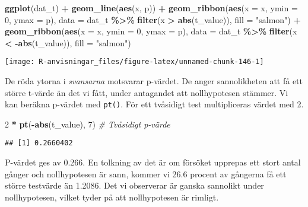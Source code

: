 \documentclass[
]{book}
\newenvironment{Shaded}{\begin{snugshade}}{\end{snugshade}}
\newcommand{\AttributeTok}[1]{\textcolor[rgb]{0.13,0.29,0.53}{#1}}
\newcommand{\CommentTok}[1]{\textcolor[rgb]{0.56,0.35,0.01}{\textit{#1}}}
\newcommand{\DecValTok}[1]{\textcolor[rgb]{0.00,0.00,0.81}{#1}}
\newcommand{\FunctionTok}[1]{\textcolor[rgb]{0.13,0.29,0.53}{\textbf{#1}}}
\newcommand{\NormalTok}[1]{#1}
\newcommand{\SpecialCharTok}[1]{\textcolor[rgb]{0.81,0.36,0.00}{\textbf{#1}}}
\newcommand{\StringTok}[1]{\textcolor[rgb]{0.31,0.60,0.02}{#1}}
\theoremstyle{definition}
\theoremstyle{definition}
\theoremstyle{definition}
\theoremstyle{definition}
\theoremstyle{remark}
\begin{document}
\begin{Shaded}
\begin{Highlighting}[]
\FunctionTok{ggplot}\NormalTok{(dat\_t) }\SpecialCharTok{+}
  \FunctionTok{geom\_line}\NormalTok{(}\FunctionTok{aes}\NormalTok{(x, p)) }\SpecialCharTok{+}
  \FunctionTok{geom\_ribbon}\NormalTok{(}\FunctionTok{aes}\NormalTok{(}\AttributeTok{x =}\NormalTok{ x, }\AttributeTok{ymin =} \DecValTok{0}\NormalTok{, }\AttributeTok{ymax =}\NormalTok{ p), }\AttributeTok{data =}\NormalTok{ dat\_t }\SpecialCharTok{\%\textgreater{}\%} \FunctionTok{filter}\NormalTok{(x }\SpecialCharTok{\textgreater{}} \FunctionTok{abs}\NormalTok{(t\_value)), }\AttributeTok{fill =} \StringTok{"salmon"}\NormalTok{) }\SpecialCharTok{+}
  \FunctionTok{geom\_ribbon}\NormalTok{(}\FunctionTok{aes}\NormalTok{(}\AttributeTok{x =}\NormalTok{ x, }\AttributeTok{ymin =} \DecValTok{0}\NormalTok{, }\AttributeTok{ymax =}\NormalTok{ p), }\AttributeTok{data =}\NormalTok{ dat\_t }\SpecialCharTok{\%\textgreater{}\%} \FunctionTok{filter}\NormalTok{(x }\SpecialCharTok{\textless{}} \SpecialCharTok{{-}}\FunctionTok{abs}\NormalTok{(t\_value)), }\AttributeTok{fill =} \StringTok{"salmon"}\NormalTok{)}
\end{Highlighting}
\end{Shaded}

\begin{center}\texttt{[image: R-anvisningar\_files/figure-latex/unnamed-chunk-146-1]} \end{center}

De röda ytorna i \emph{svansarna} motsvarar p-värdet. De anger sannolikheten att få ett större t-värde än det vi fått, under antagandet att nollhypotesen stämmer. Vi kan beräkna p-värdet med \texttt{pt()}. För ett tvåsidigt test multipliceras värdet med 2.

\begin{Shaded}
\begin{Highlighting}[]
\DecValTok{2} \SpecialCharTok{*} \FunctionTok{pt}\NormalTok{(}\SpecialCharTok{{-}}\FunctionTok{abs}\NormalTok{(t\_value), }\DecValTok{7}\NormalTok{) }\CommentTok{\# Tvåsidigt p{-}värde}
\end{Highlighting}
\end{Shaded}

\begin{verbatim}
## [1] 0.2660402
\end{verbatim}

P-värdet ges av 0.266. En tolkning av det är om försöket upprepas ett stort antal gånger och nollhypotesen är sann, kommer vi 26.6 procent av gångerna få ett större testvärde än 1.2086. Det vi observerar är ganska sannolikt under nollhypotesen, vilket tyder på att nollhypotesen är rimligt.
\end{document}
